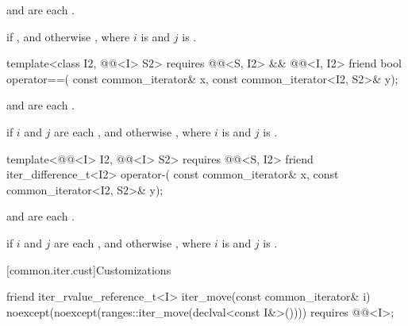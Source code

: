 \begin{itemdescr}
\pnum
\expects
{} and 
are each .

\pnum
\returns
{} if ,
and otherwise ,
where $i$ is  and $j$ is .
\end{itemdescr}

%
\begin{itemdecl}
template<class I2, @@<I> S2>
  requires @@<S, I2> && @@<I, I2>
friend bool operator==(
  const common_iterator& x, const common_iterator<I2, S2>& y);
\end{itemdecl}

\begin{itemdescr}
\pnum
\expects
{} and 
are each .

\pnum
\returns
{} if $i$ and $j$ are each , and otherwise
, where
$i$ is  and $j$ is .
\end{itemdescr}

%
\begin{itemdecl}
template<@@<I> I2, @@<I> S2>
  requires @@<S, I2>
friend iter_difference_t<I2> operator-(
  const common_iterator& x, const common_iterator<I2, S2>& y);
\end{itemdecl}

\begin{itemdescr}
\pnum
\expects
{} and 
are each .

\pnum
\returns
{} if $i$ and $j$ are each , and otherwise
, where
$i$ is  and $j$ is .
\end{itemdescr}

[common.iter.cust]{Customizations}

%
\begin{itemdecl}
friend iter_rvalue_reference_t<I> iter_move(const common_iterator& i)
  noexcept(noexcept(ranges::iter_move(declval<const I&>())))
    requires @@<I>;
\end{itemdecl}

